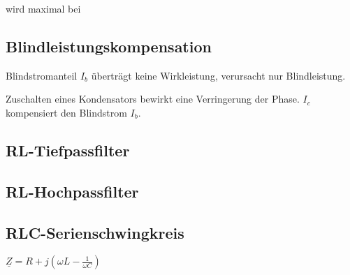 \documentclass[10pt,a4paper]{scrartcl}
\begin{document}
\begin{multicols*}{3}
	wird maximal bei 
	
	 
	
	\subsection{Blindleistungskompensation}
	
	
	Blindstromanteil $I_b$ überträgt keine Wirkleistung, verursacht nur Blindleistung.
	
	
	Zuschalten eines Kondensators bewirkt eine Verringerung der Phase. $I_c$ kompensiert den Blindstrom $I_b$.
	
	\columnbreak
	
	\subsection{RL-Tiefpassfilter}
	
	
	
	
	\subsection{RL-Hochpassfilter}
	
	
	
	
	\vfill
	\null	 
	\columnbreak
	
	\subsection{RLC-Serienschwingkreis}
	
	
	
	
	$\underline{Z}=R+j(\omega L - \frac{1}{\omega C})$
		

\end{multicols*}
\end{document}

